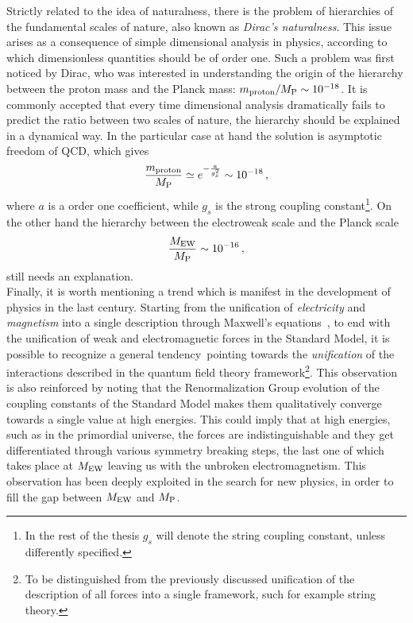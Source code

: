 \documentclass[12pt,a4paper]{book}
\begin{document}
Strictly related to the idea of naturalness, there is the problem of hierarchies of the fundamental scales of nature, also known as \textit{Dirac's naturalness}. This issue arises as a consequence of simple dimensional analysis in physics, according to which dimensionless quantities should be of order one. Such a problem was first noticed by Dirac, who was interested in understanding the origin of the hierarchy between the proton mass and the Planck mass: $m_{\rm proton}/M_{\rm P} \sim 10^{-18}$. It is commonly accepted that every time dimensional analysis dramatically fails to predict the ratio between two scales of nature, the hierarchy should be explained in a dynamical way. In the particular case at hand the solution is asymptotic freedom of QCD, which gives
\begin{align}
\label{eq:ProtonVsPlanckMass}
\frac{m_{\rm proton}}{M_{\rm P}} \simeq e^{-\frac{a}{g_s^2}} \sim 10^{-18}\,,
\end{align}
where $a$ is a order one coefficient, while $g_s$ is the strong coupling constant\footnote{In the rest of the thesis $g_s$ will denote the string coupling constant, unless differently specified.}. On the other hand the hierarchy between the electroweak scale and the Planck scale
\begin{align}
\label{eq:EWVsPlanckMass}
\frac{M_{\rm EW}}{M_{\rm P}} \sim 10^{-16} \,,
\end{align}
still needs an explanation.\\


Finally, it is worth mentioning a trend which is manifest in the development of physics in the last century. Starting from the unification of \textit{electricity} and \textit{magnetism} into a single description through Maxwell's equations~\cite{Maxwell:1865zz}, to end with the unification of weak and electromagnetic forces in the Standard Model, it is possible to recognize a general tendency\, pointing towards the \textit{unification} of the interactions described in the quantum field theory framework\footnote{To be distinguished from the previously discussed unification of the description of all forces into a single framework, such for example string theory.}. This observation is also reinforced by noting that the Renormalization Group evolution of the coupling constants of the Standard Model makes them qualitatively converge towards a single value at high energies. This could imply that at high energies, such as in the primordial universe, the forces are indistinguishable and they get differentiated through various symmetry breaking steps, the last one of which takes place at $M_{\rm EW}$ leaving us with the unbroken electromagnetism. This observation has been deeply exploited in the search for new physics, in order to fill the gap between $M_{\rm EW}$ and $M_{\rm P}$.\\
\end{document}
